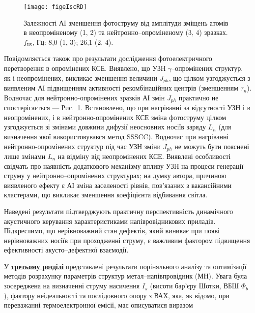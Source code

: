 \documentclass[a5paper,10pt,twoside,openany,article]{memoir} %
\begin{document}
\begin{figure}[ht]
\center
\texttt{[image: figeIscRD]}
\caption{\label{figeIscRD}
Залежності АІ зменшення фотоструму від
амплітуди зміщень атомів в неопроміненому (1, 2)
та нейтронно--опроміненому (3, 4) зразках.
$f_\mathtt{US}$, Гц: 8,0 (1, 3);
26,1 (2, 4).
}%
\end{figure}
Повідомляється також про результати дослідження фотоелектричного перетворення в опромінених КСЕ.
Виявлено, що УЗН $\gamma$--опромінених структур, як і неопромінених, викликає зменшення величини $J_{ph}$, що цілком
узгоджується з виявленим АІ підвищенням активності рекомбінаційних центрів (зменшенням $\tau_n$).
Водночас для нейтронно-опромінених зразків АІ змін $J_{ph}$ практично не спостерігається --- Рис.~\ref{figeIscRD}.
Встановлено, що при нагріванні за відсутності УЗН і в неопромінених, і в нейтронно-опромінених КСЕ зміна фотоструму
цілком узгоджується зі змінами довжини дифузії неосновних носіїв заряду $L_n$ (для визначення якої використовувався метод SSSCC).
Водночас при нагріванні нейтронно-опромінених структур під час УЗН зміни $J_{ph}$ не можуть бути пояснені лише змінами $L_n$ на відміну від неопромінених КСЕ.
Виявлені особливості свідчать про наявність додаткового механізму впливу УЗН на процеси генерації струму у нейтронно--опромінених структурах;
на думку автора, причиною виявленого ефекту є АІ зміна заселеності рівнів, пов'язаних з вакансійними кластерами, що викликає зменшення коефіцієнта відбивання світла.


Наведені   результати  підтверджують  практичну перспективність динамічного акустичного керування характеристиками напівровідникових приладів.
Підкреслимо, що нерівноважний стан дефектів, який виникає при появі нерівноважних носіїв при проходженні струму, є важливим фактором підвищення ефективності акусто--дефектної взаємодії.

У  \underline{\textbf{третьому розділі}} представлені результати поріняльного аналізу та оптимізації методів розрахунку параметрів структур метал--напівпровідник (МН).
Увага була зосереджена на визначенні струму насичення  $I_s$ (висоти бар'єру Шотки, ВБШ $\Phi_b$), фактору неідеальності та послідовного опору з ВАХ, яка, як відомо, при переважанні термоелектронної емісії, має описуватися виразом
\end{document}
